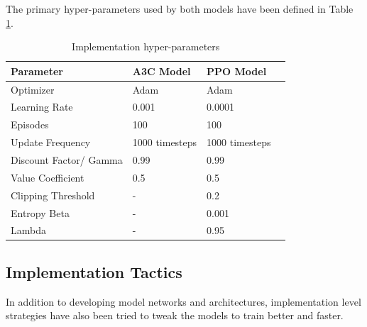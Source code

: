 \documentclass[conference]{IEEEtran}
\begin{document}
The primary hyper-parameters used by both models have been defined in Table \ref{hyperparam_table}.

\begin{table}[h!]
    \centering
    \begin{tabular}{ |l|l|l|l| } 
        \hline
        Parameter & A3C Model & PPO Model \\
        \hline
        Optimizer              & Adam           & Adam \\ 
        Learning Rate          & 0.001          & 0.0001 \\ 
        Episodes               & 100            & 100 \\ 
        Update Frequency       & 1000 timesteps & 1000 timesteps \\ 
        Discount Factor/ Gamma & 0.99           & 0.99 \\ 
        Value Coefficient      & 0.5            & 0.5 \\ 
        Clipping Threshold     & -              & 0.2 \\
        Entropy Beta           & -              & 0.001 \\
        Lambda                 & -              & 0.95 \\
    \hline
    \end{tabular}
    \vspace{1ex}
    \caption{Implementation hyper-parameters}
    \label{hyperparam_table}
\end{table}

\subsection{\textbf{Implementation Tactics}}

In addition to developing model networks and architectures, implementation level strategies have also been tried to tweak the models to train better and faster.
\end{document}
